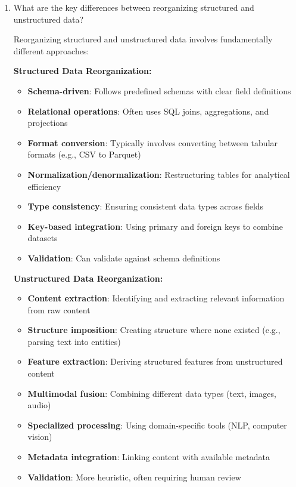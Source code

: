 \documentclass[12pt]{article}
\begin{document}
\begin{enumerate}
    \item What are the key differences between reorganizing structured and unstructured data?
    
    \begin{tcolorbox}[colback=blue!5!white,colframe=blue!75!black,title={Solution}]
    Reorganizing structured and unstructured data involves fundamentally different approaches:
    
    \textbf{Structured Data Reorganization:}
    \begin{itemize}
        \item \textbf{Schema-driven}: Follows predefined schemas with clear field definitions
        \item \textbf{Relational operations}: Often uses SQL joins, aggregations, and projections
        \item \textbf{Format conversion}: Typically involves converting between tabular formats (e.g., CSV to Parquet)
        \item \textbf{Normalization/denormalization}: Restructuring tables for analytical efficiency
        \item \textbf{Type consistency}: Ensuring consistent data types across fields
        \item \textbf{Key-based integration}: Using primary and foreign keys to combine datasets
        \item \textbf{Validation}: Can validate against schema definitions
    \end{itemize}
    
    \textbf{Unstructured Data Reorganization:}
    \begin{itemize}
        \item \textbf{Content extraction}: Identifying and extracting relevant information from raw content
        \item \textbf{Structure imposition}: Creating structure where none existed (e.g., parsing text into entities)
        \item \textbf{Feature extraction}: Deriving structured features from unstructured content
        \item \textbf{Multimodal fusion}: Combining different data types (text, images, audio)
        \item \textbf{Specialized processing}: Using domain-specific tools (NLP, computer vision)
        \item \textbf{Metadata integration}: Linking content with available metadata
        \item \textbf{Validation}: More heuristic, often requiring human review
    \end{itemize}
    

\end{tcolorbox}
\end{enumerate}
\end{document}
